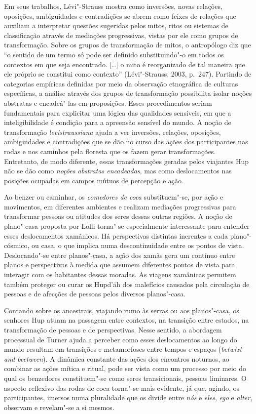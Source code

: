 Em seus trabalhos, Lévi"-Strauss mostra como inversões, novas relações,
oposições, ambiguidades e contradições se abrem como feixes de relações
que auxiliam a interpretar questões sugeridas pelos mitos, ritos ou
sistemas de classificação através de mediações progressivas, vistas por
ele como grupos de transformação. Sobre os grupos de transformação de
mitos, o antropólogo diz que ``o sentido de um termo só pode ser
definido substituindo"-o em todos os contextos em que seja encontrado.
{[}\ldots{}{]} o mito é reorganizado de tal maneira que ele próprio se
constitui como contexto'' (Lévi"-Strauss, 2003, p.~247). Partindo de
categorias empíricas definidas por meio da observação etnográfica de
culturas específicas, a análise através dos grupos de transformação
possibilita isolar noções abstratas e encadeá"-las em proposições. Esses
procedimentos seriam fundamentais para explicitar uma lógica das
qualidades sensíveis, em que a inteligibilidade é condição para a
apreensão sensível do mundo. A noção de transformação \textit{levistraussiana}
ajuda a ver inversões, relações, oposições, ambiguidades e contradições
que se dão no curso das ações dos participantes nas rodas e nos caminhos
pela floresta que os fazem gerar transformações. Entretanto, de modo
diferente, essas transformações geradas pelos viajantes Hup não se dão
como \textit{noções abstratas encadeadas}, mas como deslocamentos nas
posições ocupadas em campos mútuos de percepção e ação.

Ao benzer ou caminhar, os \textit{comedores de coca} substituem"-se, por ação
e movimentos, em diferentes ambientes e realizam mediações progressivas
para transformar pessoas ou atitudes dos seres dessas outras regiões. A
noção de plano"-casa proposta por Lolli torna"-se especialmente
interessante para entender esses deslocamentos xamânicos. Há
perspectivas distintas inerentes a cada plano"-cósmico, ou casa, o que
implica numa descontinuidade entre os pontos de vista. Deslocando"-se
entre planos"-casa, a ação dos xamãs gera um contínuo entre planos e
perspectivas à medida que assumem diferentes pontos de vista para
interagir com os habitantes dessas moradas. As viagens xamânicas
permitem também proteger ou curar os Hupd'äh dos malefícios causados
pela circulação de pessoas e de afecções de pessoas pelos diversos
planos"-casa.

Contando sobre os ancestrais, viajando rumo às serras ou aos
planos"-casa, os senhores Hup atuam na passagem entre contextos, na
transição entre estados, na transformação de pessoas e de perspectivas.
Nesse sentido, a abordagem processual de Turner ajuda a perceber como
esses deslocamentos ao longo do mundo resultam em transições e
metamorfoses entre tempos e espaços (\textit{betwixt and beetween}). A
dinâmica constante das ações dos encontros noturnos, ao combinar as
ações mítica e ritual, pode ser vista como um processo por meio do qual
os benzedores constituem"-se como seres transicionais, pessoas liminares.
O aspecto reflexivo das rodas de coca torna"-se mais evidente, já que,
agindo, os participantes, imersos numa pluralidade que os divide entre
\textit{nós} e \textit{eles}, \textit{ego} e \textit{alter}, observam e revelam"-se a si
mesmos.

